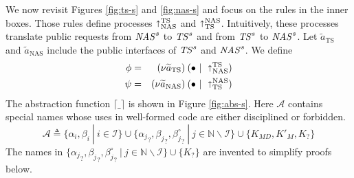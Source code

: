\documentclass[10pt]{article}
\newcommand{\new}[2]{(\nu #1)\:#2}
\newcommand{\seq}{\widetilde}
\newcommand{\betac}{\beta^\circ}
\begin{document}
We now revisit Figures \ref{fig:ts-s} and \ref{fig:nas-s} and focus on the rules in the inner boxes. Those rules define processes $\shortuparrow^\mathrm{TS}_\mathrm{NAS}$ and $\shortuparrow^\mathrm{NAS}_\mathrm{TS}$. Intuitively, these processes translate public requests from ${\it NAS}^s$ to ${\it TS}^s$ and from ${\it TS}^s$ to ${\it NAS}^s$. Let $\seq a_\mathrm{TS}$ and $\seq a_\mathrm{NAS}$ include the public interfaces of ${\it TS}^s$ and ${\it NAS}^s$. We define 
\begin{eqnarray*}
\phi & = & \new{\seq a_\mathrm{TS}} (\bullet~|~\shortuparrow^\mathrm{TS}_\mathrm{NAS}) \\
\psi & = & \new{\seq a_\mathrm{NAS}} (\bullet~|~\shortuparrow^\mathrm{NAS}_\mathrm{TS}) 
\end{eqnarray*}
The abstraction function $\lceil\_\rceil$ is shown in Figure \ref{fig:abs-s}. Here $\mathcal A$ contains special names whose uses in well-formed code are either disciplined or forbidden. 
$$\mathcal A \triangleq  \{\alpha_i,\beta_i~|~i \in \mathcal I\} \cup \{{\alpha_j}_?, {\beta_j}_?,{\betac_j}_?~|~j \in \mathbb N\backslash \mathcal I\} \cup \{K_{M\!D},K'_M,K_?\}$$
The names in $\{{\alpha_j}_?, {\beta_j}_?,{\betac_j}_?~|~j \in \mathbb N\backslash \mathcal I\} \cup \{K_?\}$ are invented to simplify proofs below.
\end{document}
